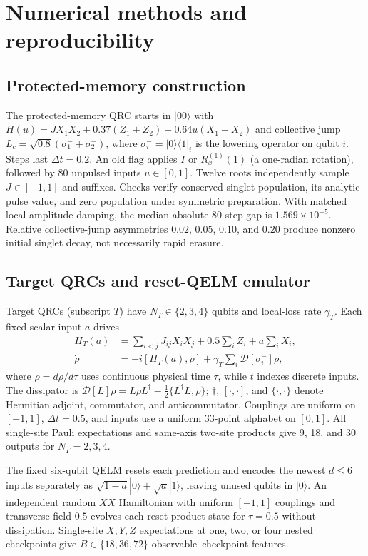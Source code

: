 \section{Numerical methods and reproducibility}
\label{sec:methods}

\subsection{Protected-memory construction}

The protected-memory QRC starts in $|00\rangle$ with
$H(u)=JX_1X_2+0.37(Z_1+Z_2)+0.64u(X_1+X_2)$ and collective jump
$L_c=\sqrt{0.8}(\sigma_1^-+\sigma_2^-)$, where
$\sigma_i^-=|0\rangle\langle1|_i$ is the lowering operator on qubit $i$.
Steps last $\Delta t=0.2$. An old flag applies $I$ or $R_x^{(1)}(1)$
(a one-radian rotation), followed by 80 unpulsed inputs $u\in[0,1]$.
Twelve roots independently sample $J\in[-1,1]$ and suffixes. Checks verify
conserved singlet population, its analytic pulse value, and zero population
under symmetric preparation. With matched local amplitude damping,
the median absolute 80-step gap is $1.569\times10^{-5}$.
Relative collective-jump asymmetries $0.02$, $0.05$, $0.10$, and $0.20$
produce nonzero initial singlet decay, not necessarily rapid erasure.

\subsection{Target QRCs and reset-QELM emulator}

Target QRCs (subscript $T$) have $N_T\in\{2,3,4\}$ qubits and local-loss
rate $\gamma_T$. Each fixed scalar input $a$ drives
\begin{align}
 H_T(a)&=\sum_{i<j}J_{ij}X_iX_j+0.5\sum_i Z_i+a\sum_iX_i,\nonumber\\
 \dot\rho&=-i[H_T(a),\rho]+\gamma_T\sum_i\mathcal D[\sigma_i^-]\rho,
 \label{eq:target-qrc-model}
\end{align}
where $\dot\rho=d\rho/d\tau$ uses continuous physical time $\tau$, while
$t$ indexes discrete inputs. The dissipator is
$\mathcal D[L]\rho=L\rho L^\dagger-\tfrac12\{L^\dagger L,\rho\}$;
$\dagger$, $[\cdot,\cdot]$, and $\{\cdot,\cdot\}$ denote Hermitian adjoint,
commutator, and anticommutator. Couplings are uniform on $[-1,1]$,
$\Delta t=0.5$, and inputs use a uniform 33-point alphabet on $[0,1]$.
All single-site Pauli expectations and same-axis two-site products give
9, 18, and 30 outputs for $N_T=2,3,4$.

The fixed six-qubit QELM resets each prediction and encodes the newest
$d\leq6$ inputs separately as
$\sqrt{1-a}|0\rangle+\sqrt a|1\rangle$, leaving unused qubits in $|0\rangle$.
An independent random $XX$ Hamiltonian with uniform $[-1,1]$ couplings
and transverse field $0.5$ evolves each reset product state for $\tau=0.5$
without dissipation. Single-site $X,Y,Z$ expectations at one, two, or four
nested checkpoints give $B\in\{18,36,72\}$ observable--checkpoint features.

